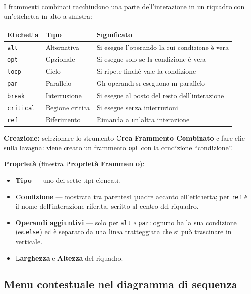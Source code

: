 \documentclass[a4paper,11pt]{article}
\newcommand{\uielement}[1]{\textbf{#1}}
\begin{document}
I frammenti combinati racchiudono una parte dell'interazione in un riquadro con un'etichetta in
alto a sinistra:

\begin{center}
\begin{tabular}{@{}lll@{}}
  \toprule
  \textbf{Etichetta} & \textbf{Tipo} & \textbf{Significato} \\
  \midrule
  \texttt{alt}      & Alternativa     & Si esegue l'operando la cui condizione è vera \\
  \texttt{opt}      & Opzionale       & Si esegue solo se la condizione è vera \\
  \texttt{loop}     & Ciclo           & Si ripete finché vale la condizione \\
  \texttt{par}      & Parallelo       & Gli operandi si eseguono in parallelo \\
  \texttt{break}    & Interruzione    & Si esegue al posto del resto dell'interazione \\
  \texttt{critical} & Regione critica & Si esegue senza interruzioni \\
  \texttt{ref}      & Riferimento     & Rimanda a un'altra interazione \\
  \bottomrule
\end{tabular}
\end{center}

\textbf{Creazione:} selezionare lo strumento \uielement{Crea Frammento Combinato} e fare clic
sulla lavagna: viene creato un frammento \texttt{opt} con la condizione ``condizione''.

\textbf{Proprietà} (finestra \uielement{Proprietà Frammento}):
\begin{itemize}
  \item \textbf{Tipo} --- uno dei sette tipi elencati.
  \item \textbf{Condizione} --- mostrata tra parentesi quadre accanto all'etichetta; per
        \texttt{ref} è il nome dell'interazione riferita, scritto al centro del riquadro.
  \item \textbf{Operandi aggiuntivi} --- solo per \texttt{alt} e \texttt{par}: ognuno ha la sua
        condizione (es.\@ \texttt{else}) ed è separato da una linea tratteggiata che si può
        trascinare in verticale.
  \item \textbf{Larghezza} e \textbf{Altezza} del riquadro.
\end{itemize}

\subsection{Menu contestuale nel diagramma di sequenza}
\end{document}
